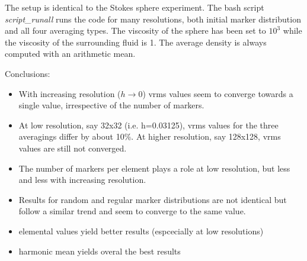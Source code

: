 The setup is identical to the Stokes sphere experiment. The bash script {\sl script\_runall} 
runs the code for many resolutions, both initial marker distribution and all four 
averaging types. The viscosity of the sphere has been 
set to $10^3$ while the viscosity of the surrounding fluid is 1. 
The average density is always computed with an arithmetic mean. 




Conclusions:
\begin{itemize}
\item
With increasing resolution ($h\rightarrow 0$) vrms values seem to converge towards a single value, irrespective 
of the number of markers. 

\item
At low resolution, say 32x32 (i.e. h=0.03125), vrms values for the three averagings differ by about 10\%. At higher resolution, say 128x128, vrms values are still not converged.  

\item
The number of markers per element plays a role at low resolution, but less and less with increasing resolution. 

\item
Results for random and regular marker distributions are not identical but follow a similar trend and seem to converge to 
the same value.

\item  elemental values yield better results (espcecially at low resolutions)

\item harmonic mean yields overal the best results
\end{itemize}

